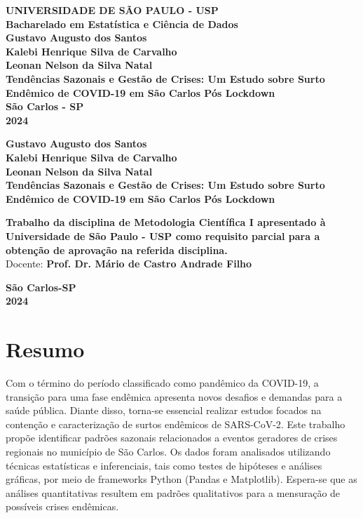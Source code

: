 \documentclass[a4paper,12pt]{report}
\begin{document}
\begin{titlepage}
    \centering
    {\large \textbf{UNIVERSIDADE DE SÃO PAULO - USP}}\\[1cm]
    {\large \textbf{Bacharelado em Estatística e Ciência de Dados}}\\[3cm]
    {\large \textbf{Gustavo Augusto dos Santos}}\\[1cm]
    {\large \textbf{Kalebi Henrique Silva de Carvalho}}\\[1cm]
    {\large \textbf{Leonan Nelson da Silva Natal}}\\[1cm]
    {\Large \textbf{Tendências Sazonais e Gestão de Crises: Um Estudo sobre Surto Endêmico de COVID-19 em São Carlos Pós Lockdown}}\\[3cm]
    \vfill
    {\large \textbf{São Carlos - SP}}\\
    {\large \textbf{2024}}
\end{titlepage}

\begin{titlepage}
    \centering
     {\large \textbf{Gustavo Augusto dos Santos}}\\[1cm]
    {\large \textbf{Kalebi Henrique Silva de Carvalho}}\\[1cm]
    {\large \textbf{Leonan Nelson da Silva Natal}}\\[1cm]
    {\Large \textbf{Tendências Sazonais e Gestão de Crises: Um Estudo sobre Surto Endêmico de COVID-19 em São Carlos Pós Lockdown}}\\[3cm]
    \vfill
\begin{flushright}
    \begin{minipage}{0.5\textwidth}
        \large{\textbf{Trabalho da disciplina de \textbf{Metodologia Científica I} apresentado à \textbf{Universidade de São Paulo - USP} como requisito parcial para a obtenção de aprovação na referida disciplina.
}}\\[2cm]
        \large{Docente: \textbf{Prof. Dr. Mário de Castro Andrade Filho }}
    \end{minipage}
\end{flushright}
    \vfill
    {\large \textbf{São Carlos-SP}}\\
    {\large \textbf{2024}}
\end{titlepage}

\chapter*{Resumo}
Com o término do período classificado como pandêmico da COVID-19, a transição para uma fase endêmica apresenta novos desafios e demandas para a saúde pública. Diante disso, torna-se essencial realizar estudos focados na contenção e caracterização de surtos endêmicos de SARS-CoV-2. Este trabalho propõe identificar padrões sazonais relacionados a eventos geradores de crises regionais no município de São Carlos. Os dados foram analisados utilizando técnicas estatísticas e inferenciais, tais como testes de hipóteses e análises gráficas, por meio de frameworks Python (Pandas e Matplotlib). Espera-se que as análises quantitativas resultem em padrões qualitativos para a mensuração de possíveis crises endêmicas.
\end{document}
